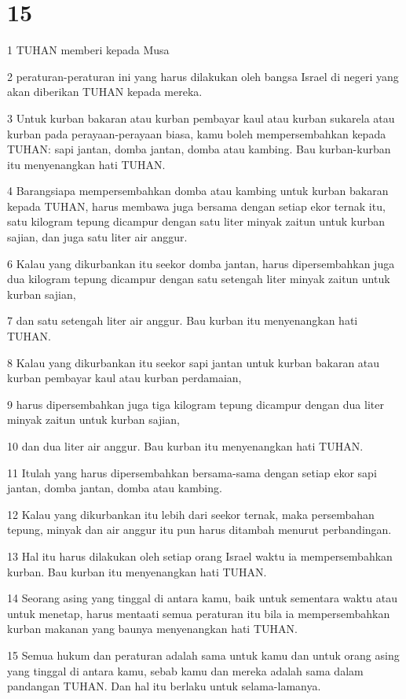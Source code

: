 \chapter{15}

\par 1 TUHAN memberi kepada Musa
\par 2 peraturan-peraturan ini yang harus dilakukan oleh bangsa Israel di negeri yang akan diberikan TUHAN kepada mereka.
\par 3 Untuk kurban bakaran atau kurban pembayar kaul atau kurban sukarela atau kurban pada perayaan-perayaan biasa, kamu boleh mempersembahkan kepada TUHAN: sapi jantan, domba jantan, domba atau kambing. Bau kurban-kurban itu menyenangkan hati TUHAN.
\par 4 Barangsiapa mempersembahkan domba atau kambing untuk kurban bakaran kepada TUHAN, harus membawa juga bersama dengan setiap ekor ternak itu, satu kilogram tepung dicampur dengan satu liter minyak zaitun untuk kurban sajian, dan juga satu liter air anggur.
\par 6 Kalau yang dikurbankan itu seekor domba jantan, harus dipersembahkan juga dua kilogram tepung dicampur dengan satu setengah liter minyak zaitun untuk kurban sajian,
\par 7 dan satu setengah liter air anggur. Bau kurban itu menyenangkan hati TUHAN.
\par 8 Kalau yang dikurbankan itu seekor sapi jantan untuk kurban bakaran atau kurban pembayar kaul atau kurban perdamaian,
\par 9 harus dipersembahkan juga tiga kilogram tepung dicampur dengan dua liter minyak zaitun untuk kurban sajian,
\par 10 dan dua liter air anggur. Bau kurban itu menyenangkan hati TUHAN.
\par 11 Itulah yang harus dipersembahkan bersama-sama dengan setiap ekor sapi jantan, domba jantan, domba atau kambing.
\par 12 Kalau yang dikurbankan itu lebih dari seekor ternak, maka persembahan tepung, minyak dan air anggur itu pun harus ditambah menurut perbandingan.
\par 13 Hal itu harus dilakukan oleh setiap orang Israel waktu ia mempersembahkan kurban. Bau kurban itu menyenangkan hati TUHAN.
\par 14 Seorang asing yang tinggal di antara kamu, baik untuk sementara waktu atau untuk menetap, harus mentaati semua peraturan itu bila ia mempersembahkan kurban makanan yang baunya menyenangkan hati TUHAN.
\par 15 Semua hukum dan peraturan adalah sama untuk kamu dan untuk orang asing yang tinggal di antara kamu, sebab kamu dan mereka adalah sama dalam pandangan TUHAN. Dan hal itu berlaku untuk selama-lamanya.
